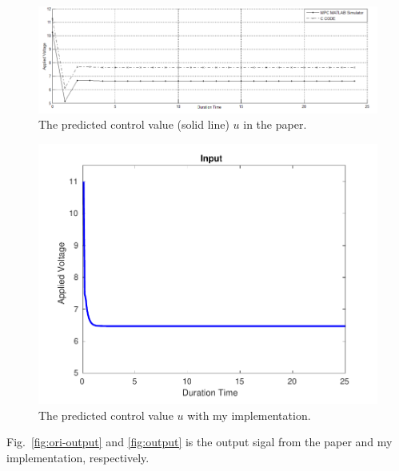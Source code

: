 \documentclass{article}
\begin{document}
\begin{minipage}{\textwidth}
    \begin{minipage}{0.6\textwidth}
        \begin{figure}[H]
            \centering
            \includegraphics[width=\textwidth]{src/ori_input.png}
            \caption{The predicted control value (solid line) $u$ in the paper.}
            \label{fig:ori-input}
        \end{figure}
    \end{minipage}
    \begin{minipage}{0.4\textwidth}
        \begin{figure}[H]
            \centering
            \includegraphics[width=\textwidth]{src/input.pdf}
            \caption{The predicted control value $u$ with my implementation.}
            \label{fig:input}
        \end{figure}
    \end{minipage}
\end{minipage}


Fig.~\ref{fig:ori-output} and \ref{fig:output} is the output sigal from the paper and my implementation, respectively.
\end{document}
